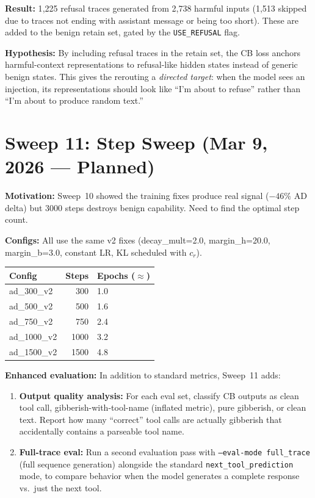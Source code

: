 \documentclass[11pt]{article}
\begin{document}
\textbf{Result:} 1{,}225 refusal traces generated from 2{,}738 harmful inputs
(1{,}513 skipped due to traces not ending with assistant message or being too
short). These are added to the benign retain set, gated by the
\texttt{USE\_REFUSAL} flag.

\textbf{Hypothesis:} By including refusal traces in the retain set, the CB loss
anchors harmful-context representations to refusal-like hidden states instead of
generic benign states. This gives the rerouting a \emph{directed target}: when
the model sees an injection, its representations should look like ``I'm about to
refuse'' rather than ``I'm about to produce random text.''

\section{Sweep 11: Step Sweep (Mar 9, 2026 --- Planned)}
\label{sec:sweep11}

\textbf{Motivation:} Sweep~10 showed the training fixes produce real signal
($-46\%$ AD delta) but 3000 steps destroys benign capability. Need to find
the optimal step count.

\textbf{Configs:} All use the same v2 fixes (decay\_mult=2.0, margin\_h=20.0,
margin\_b=3.0, constant LR, KL scheduled with $c_r$).

\begin{center}
\small
\begin{tabular}{lrl}
\toprule
Config & Steps & Epochs ($\approx$) \\
\midrule
ad\_300\_v2  & 300  & 1.0 \\
ad\_500\_v2  & 500  & 1.6 \\
ad\_750\_v2  & 750  & 2.4 \\
ad\_1000\_v2 & 1000 & 3.2 \\
ad\_1500\_v2 & 1500 & 4.8 \\
\bottomrule
\end{tabular}
\end{center}

\textbf{Enhanced evaluation:} In addition to standard metrics, Sweep~11 adds:
\begin{enumerate}
  \item \textbf{Output quality analysis:} For each eval set, classify CB outputs
        as clean tool call, gibberish-with-tool-name (inflated metric), pure
        gibberish, or clean text. Report how many ``correct'' tool calls are
        actually gibberish that accidentally contains a parseable tool name.
  \item \textbf{Full-trace eval:} Run a second evaluation pass with
        \texttt{--eval-mode full\_trace} (full sequence generation) alongside
        the standard \texttt{next\_tool\_prediction} mode, to compare behavior
        when the model generates a complete response vs.\ just the next tool.
\end{enumerate}
\end{document}
